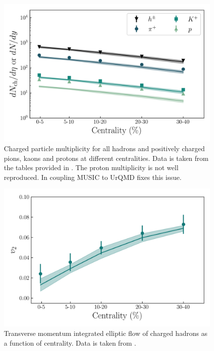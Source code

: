 \begin{figure}[H]
	\includegraphics[width=\textwidth]{images/dn_cent_shear.png}
	\caption{\normalsize Charged particle multiplicity for all hadrons and positively charged pions, kaons and protons at different centralities. Data is taken from the tables provided in \cite{Abelev:2008ab}. The proton multiplicity is not well reproduced. In \cite{ryubulk} coupling {\sffamily MUSIC} to {\sffamily UrQMD} fixes this issue.} 
\end{figure}


\begin{figure}[H]
	\includegraphics[width=\textwidth]{images/vn_cent.png}
	\caption{\normalsize Transverse momentum integrated elliptic flow of charged hadrons as a function of centrality. Data is taken from \cite{Abelev:2008ae}.} 
\end{figure}

